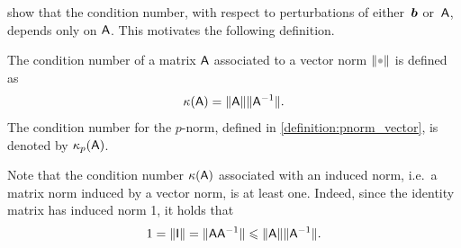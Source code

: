  show that
the condition number, with respect to perturbations of either~$\mathbf{\boldsymbol{b}}$ or~$\mathsf A$,
depends only on $\mathsf A$.
This motivates the following definition.
\begin{definition}
    The condition number of a matrix $\mathsf A$ associated to a vector norm $\norm{\placeholder}$ is defined as
    \[
        \kappa(\mathsf A) = \lVert\mathsf A\rVert \lVert\mathsf A^{-1}\rVert.
    \]
    The condition number for the $p$-norm,
    defined in \cref{definition:pnorm_vector},
    is denoted by $\kappa_p(\mathsf A)$.
\end{definition}
Note that the condition number $\kappa(\mathsf A)$ associated with an induced norm,
i.e.\ a matrix norm induced by a vector norm,
is at least one.
Indeed, since the identity matrix has induced norm 1,
it holds that
\[
    1 = \lVert\mathsf I\rVert = \lVert\mathsf A \mathsf A^{-1}\rVert\leqslant \lVert\mathsf A\rVert \lVert\mathsf A^{-1}\rVert.
\]

